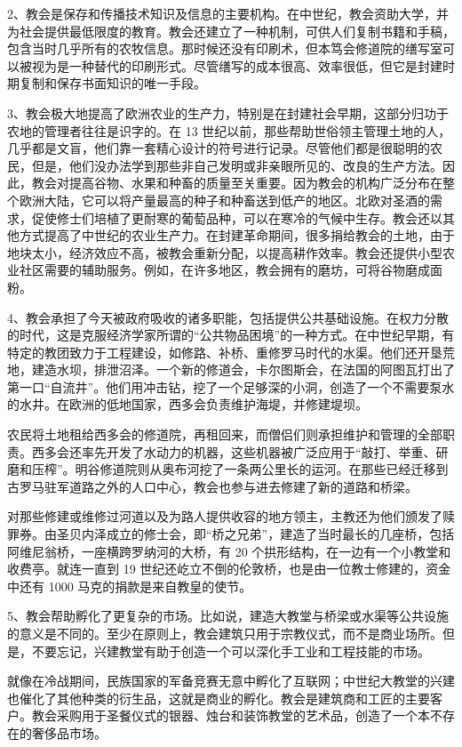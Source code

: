 2、教会是保存和传播技术知识及信息的主要机构。在中世纪，教会资助大学，并为社会提供最低限度的教育。教会还建立了一种机制，可供人们复制书籍和手稿，包含当时几乎所有的农牧信息。那时候还没有印刷术，但本笃会修道院的缮写室可以被视为是一种替代的印刷形式。尽管缮写的成本很高、效率很低，但它是封建时期复制和保存书面知识的唯一手段。

3、教会极大地提高了欧洲农业的生产力，特别是在封建社会早期，这部分归功于农地的管理者往往是识字的。在 13 世纪以前，那些帮助世俗领主管理土地的人，几乎都是文盲，他们靠一套精心设计的符号进行记录。尽管他们都是很聪明的农民，但是，他们没办法学到那些非自己发明或非亲眼所见的、改良的生产方法。因此，教会对提高谷物、水果和种畜的质量至关重要。因为教会的机构广泛分布在整个欧洲大陆，它可以将产量最高的种子和种畜送到低产的地区。北欧对圣酒的需求，促使修士们培植了更耐寒的葡萄品种，可以在寒冷的气候中生存。教会还以其他方式提高了中世纪的农业生产力。在封建革命期间，很多捐给教会的土地，由于地块太小，经济效应不高，被教会重新分配，以提高耕作效率。教会还提供小型农业社区需要的辅助服务。例如，在许多地区，教会拥有的磨坊，可将谷物磨成面粉。

4、教会承担了今天被政府吸收的诸多职能，包括提供公共基础设施。在权力分散的时代，这是克服经济学家所谓的“公共物品困境”的一种方式。在中世纪早期，有特定的教团致力于工程建设，如修路、补桥、重修罗马时代的水渠。他们还开垦荒地，建造水坝，排泄沼泽。一个新的修道会，卡尔图斯会，在法国的阿图瓦打出了第一口“自流井”。他们用冲击钻，挖了一个足够深的小洞，创造了一个不需要泵水的水井。在欧洲的低地国家，西多会负责维护海堤，并修建堤坝。

农民将土地租给西多会的修道院，再租回来，而僧侣们则承担维护和管理的全部职责。西多会还率先开发了水动力的机器，这些机器被广泛应用于“敲打、举重、研磨和压榨”。明谷修道院则从奥布河挖了一条两公里长的运河。在那些已经迁移到古罗马驻军道路之外的人口中心，教会也参与进去修建了新的道路和桥梁。

对那些修建或维修过河道以及为路人提供收容的地方领主，主教还为他们颁发了赎罪券。由圣贝内泽成立的修士会，即“桥之兄弟”，建造了当时最长的几座桥，包括阿维尼翁桥，一座横跨罗纳河的大桥，有 20 个拱形结构，在一边有一个小教堂和收费亭。就连一直到 19 世纪还屹立不倒的伦敦桥，也是由一位教士修建的，资金中还有 1000 马克的捐款是来自教皇的使节。

5、教会帮助孵化了更复杂的市场。比如说，建造大教堂与桥梁或水渠等公共设施的意义是不同的。至少在原则上，教会建筑只用于宗教仪式，而不是商业场所。但是，不要忘记，兴建教堂有助于创造一个可以深化手工业和工程技能的市场。

就像在冷战期间，民族国家的军备竞赛无意中孵化了互联网；中世纪大教堂的兴建也催化了其他种类的衍生品，这就是商业的孵化。教会是建筑商和工匠的主要客户。教会采购用于圣餐仪式的银器、烛台和装饰教堂的艺术品，创造了一个本不存在的奢侈品市场。

